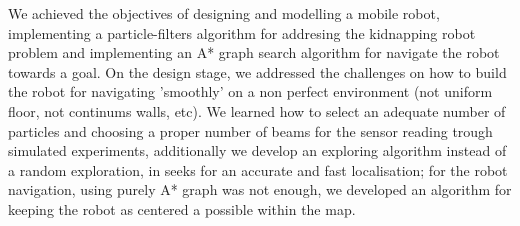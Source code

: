 We achieved the objectives of designing and modelling a mobile robot, implementing a particle-filters algorithm for addresing the kidnapping robot problem and implementing an A* graph search algorithm for navigate the robot towards a goal. On the design stage, we addressed the challenges on how to build the robot for navigating  'smoothly' on a non perfect environment (not uniform floor, not continums walls, etc). We learned how to select an adequate number of particles and choosing a proper number of beams for the sensor reading trough simulated experiments, additionally we develop an exploring algorithm instead of a random exploration, in seeks for an accurate and fast localisation; for the robot navigation, using purely A* graph was not enough, we developed an algorithm for keeping the robot as centered a possible within the map.

